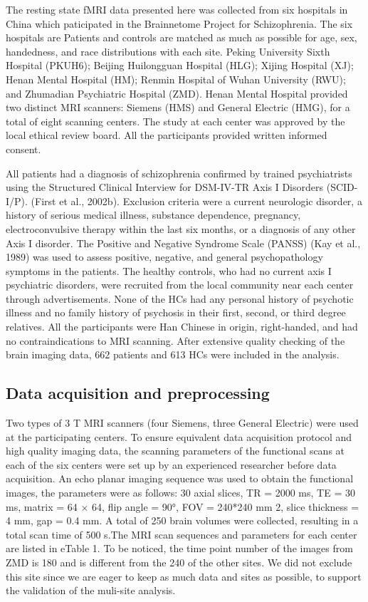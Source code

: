 \documentclass[preprint,authoryear,review,12pt]{elsarticle}
\begin{document}
The resting state fMRI data presented here was collected from six hospitals in China which paticipated in the Brainnetome Project for Schizophrenia. The six hospitals are  Patients and controls are matched as much as possible for age, sex, handedness, and race distributions with each site. Peking University Sixth Hospital (PKUH6); Beijing Huilongguan Hospital (HLG); Xijing Hospital (XJ); Henan Mental Hospital (HM);  Renmin Hospital of Wuhan University (RWU); and Zhumadian Psychiatric Hospital (ZMD). Henan Mental Hospital provided two distinct MRI scanners: Siemens (HMS) and General Electric (HMG), for a total of eight scanning centers. The study at each center was approved by the local ethical review board. All the participants provided written informed consent.

 All patients had a diagnosis of schizophrenia confirmed by trained psychiatrists using the Structured Clinical Interview for DSM-IV-TR Axis I Disorders (SCID-I/P). (First et al., 2002b). Exclusion criteria were a current neurologic disorder, a history of serious medical illness, substance dependence, pregnancy, electroconvulsive therapy within the last six months, or a diagnosis of any other Axis I disorder. The Positive and Negative Syndrome Scale (PANSS)  (Kay et al., 1989) was used to assess positive, negative, and general psychopathology symptoms in the patients. The healthy controls, who had no current axis I psychiatric disorders, were recruited from the local community near each center through advertisements. None of the HCs had any personal history of psychotic illness and no family history of psychosis in their first, second, or third degree relatives. All the participants were Han Chinese in origin, right-handed, and had no contraindications to MRI scanning. After extensive quality checking of the brain imaging data, 662 patients and 613 HCs were included in the analysis.
 
 
\subsection*{Data acquisition and preprocessing}
 
 
Two types of 3 T MRI scanners (four Siemens, three General Electric) were used at the participating centers. To ensure equivalent data acquisition protocol and high quality imaging data, the scanning parameters of the functional scans at each of the six centers were set up by an experienced researcher before data acquisition. An echo planar imaging sequence was used to obtain the
functional images, the parameters were as follows: 30 axial slices, TR = 2000 ms, TE = 30 ms, matrix = 64 × 64, flip angle = 90°, FOV = 240*240 mm 2, slice thickness = 4 mm, gap = 0.4 mm. A total of 250 brain volumes were collected, resulting in a total scan time of 500 s.The MRI scan sequences and parameters for each center are listed in eTable 1. To be noticed, the time point number of the images from ZMD is 180 and is different from the 240 of the other sites. We did not exclude this site since we are eager to keep as much data and sites as possible, to support the validation of the muli-site analysis.   
\end{document}
